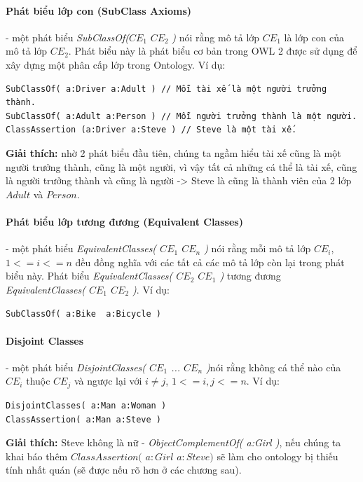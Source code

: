 \paragraph{Phát biểu lớp con (SubClass Axioms)} - một phát biểu \textit{SubClassOf(}$CE_{1}$ $CE_{2}$ \textit{)} nói rằng mô tả lớp $CE_{1}$ là lớp con của mô tả lớp $CE_{2}$. Phát biểu này là phát biểu cơ bản trong OWL 2 được sử dụng để xây dựng một phân cấp lớp trong Ontology. Ví dụ:
\begin{verbatim}
SubClassOf( a:Driver a:Adult ) // Mỗi tài xế là một người trưởng thành.
SubClassOf( a:Adult a:Person ) // Mỗi người trưởng thành là một người.
ClassAssertion (a:Driver a:Steve ) // Steve là một tài xế.
\end{verbatim}
\textbf{Giải thích:} nhờ 2 phát biểu đầu tiên, chúng ta ngầm hiểu tài xế cũng là một người trưởng thành, cũng là một người, vì vậy tất cả những cá thể là tài xế, cũng là người trưởng thành và cũng là người -> Steve là cũng là thành viên của 2 lớp $Adult$ và $Person$.

\paragraph{Phát biểu lớp tương đương (Equivalent Classes)} - một phát biểu \textit{EquivalentClasses( $CE_{1}$ $CE_{n}$ )} nói rằng mỗi mô tả lớp $CE_{i}$, $1<=i<=n$ đều đồng nghĩa với các tất cả các mô tả lớp còn lại trong phát biểu này. Phát biểu \textit{EquivalentClasses( $CE_{2}$ $CE_{1}$ )} tương đương \textit{EquivalentClasses( $CE_{1}$ $CE_{2}$ )}. Ví dụ:
\begin{verbatim}
SubClassOf( a:Bike  a:Bicycle )
\end{verbatim}

\paragraph{Disjoint Classes} - một phát biểu \textit{DisjointClasses( $CE_{1}$ ... $CE_{n}$ )}nói rằng không cá thể nào của $CE_{i}$ thuộc $CE_{j}$ và ngược lại với $i \neq j$, $1<=i,j<=n$. Ví dụ:
\begin{verbatim}
DisjointClasses( a:Man a:Woman )	
ClassAssertion( a:Man a:Steve )
\end{verbatim}
\textbf{Giải thích:} Steve không là nữ - \textit{ObjectComplementOf( a:Girl )}, nếu chúng ta khai báo thêm $ClassAssertion($ $a:Girl$ $a:Steve)$ sẽ làm cho ontology bị thiếu tính nhất quán (sẽ được nếu rõ hơn ở các chương sau).

